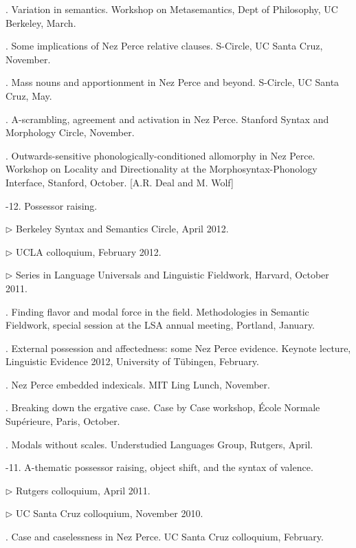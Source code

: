 \documentclass[12pt]{article}
\begin{document}
. Variation in semantics. Workshop on Metasemantics, Dept of Philosophy, UC Berkeley, March. 



. Some implications of Nez Perce relative clauses. S-Circle, UC Santa Cruz, November. 

. Mass nouns and apportionment in Nez Perce and beyond. S-Circle, UC Santa Cruz, May. 

. A-scrambling, agreement and activation in Nez Perce. 
Stanford Syntax and Morphology Circle, November. 



.  Outwards-sensitive phonologically-conditioned allomorphy in Nez Perce. 
Workshop on Locality and Directionality at the Morphosyntax-Phonology Interface, Stanford, October. [A.R. Deal and M. Wolf]



-12. Possessor raising. 

\indd $\rhd$ Berkeley Syntax and Semantics Circle, April 2012. 


\indd $\rhd$ UCLA colloquium, February 2012. 


\indd
$\rhd$ Series in Language Universals and Linguistic Fieldwork, Harvard, October 2011.




. Finding flavor and modal force in the field. 
Methodologies in Semantic Fieldwork, special session at the LSA annual meeting, Portland, January. 

. External possession and affectedness: some Nez Perce evidence. 
%
Keynote lecture, Linguistic Evidence 2012, University of T\"ubingen, February.

. Nez Perce embedded indexicals. 
MIT Ling Lunch, November. 

. Breaking down the ergative case. 
Case by Case workshop, \'Ecole Normale Sup\'erieure, Paris, October. 

. Modals without scales. 
Understudied Languages Group, Rutgers, April. 




-11. A-thematic possessor raising, object shift, and the syntax of valence. 

\indd $\rhd$  Rutgers colloquium, April 2011.

\indd $\rhd$  UC Santa Cruz colloquium, November 2010. 


. Case and caselessness in Nez Perce. 
UC Santa Cruz colloquium, February. 
\end{document}
